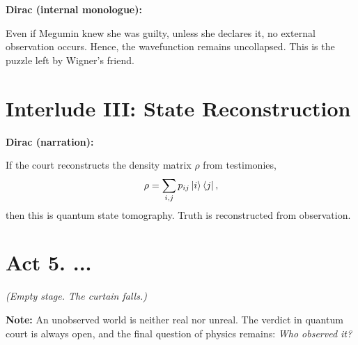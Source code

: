 \documentclass[12pt]{article}
\begin{document}
\textbf{Dirac (internal monologue):}

Even if Megumin knew she was guilty, unless she declares it, no external observation occurs. Hence, the wavefunction remains uncollapsed. This is the puzzle left by Wigner's friend\cite{zurek2002decoherence}.

\section*{Interlude III: State Reconstruction}

\textbf{Dirac (narration):}

If the court reconstructs the density matrix $\rho$ from testimonies\cite{nielsen2010quantum},
\[
\rho = \sum_{i,j} p_{ij} \ket{i}\bra{j},
\]
then this is quantum state tomography. Truth is reconstructed from observation\cite{zurek2002decoherence}.

\section*{Act 5. ...}

\textit{(Empty stage. The curtain falls.)}

\textbf{Note:} An unobserved world is neither real nor unreal. The verdict in quantum court is always open, and the final question of physics remains: \emph{Who observed it?}\cite{carroll2004introduction}

\newpage
\end{document}
